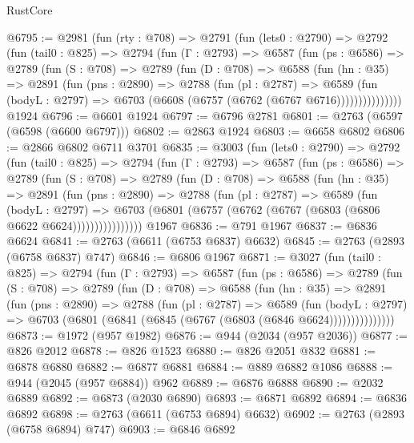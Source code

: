 \begin{lexlean}{RustCore}
\begin{coremodule}
@6795 := @2981
    (fun (rty : @708) =>
    @2791
      (fun (lets0 : @2790) =>
      @2792
        (fun (tail0 : @825) =>
        @2794
          (fun (Γ : @2793) =>
          @6587
            (fun (ps : @6586) =>
            @2789
              (fun (S : @708) =>
              @2789
                (fun (D : @708) =>
                @6588
                  (fun (hn : @35) =>
                  @2891
                    (fun (pns : @2890) =>
                    @2788
                      (fun (pl : @2787) =>
                      @6589
                        (fun (bodyL : @2797) =>
                        @6703 (@6608 (@6757 (@6762 (@6767 @6716)))))))))))))))
    @1924
@6796 := @6601 @1924
@6797 := @6796 @2781
@6801 := @2763 (@6597 (@6598 (@6600 @6797)))
@6802 := @2863 @1924
@6803 := @6658 @6802
@6806 := @2866 @6802 @6711 @3701
@6835 := @3003
    (fun (lets0 : @2790) =>
    @2792
      (fun (tail0 : @825) =>
      @2794
        (fun (Γ : @2793) =>
        @6587
          (fun (ps : @6586) =>
          @2789
            (fun (S : @708) =>
            @2789
              (fun (D : @708) =>
              @6588
                (fun (hn : @35) =>
                @2891
                  (fun (pns : @2890) =>
                  @2788
                    (fun (pl : @2787) =>
                    @6589
                      (fun (bodyL : @2797) =>
                      @6703 (@6801 (@6757 (@6762 (@6767 (@6803 (@6806 @6622 @6624))))))))))))))))
    @1967
@6836 := @791 @1967
@6837 := @6836 @6624
@6841 := @2763 (@6611 (@6753 @6837) @6632)
@6845 := @2763 (@2893 (@6758 @6837) @747)
@6846 := @6806 @1967
@6871 := @3027
    (fun (tail0 : @825) =>
    @2794
      (fun (Γ : @2793) =>
      @6587
        (fun (ps : @6586) =>
        @2789
          (fun (S : @708) =>
          @2789
            (fun (D : @708) =>
            @6588
              (fun (hn : @35) =>
              @2891
                (fun (pns : @2890) =>
                @2788
                  (fun (pl : @2787) =>
                  @6589
                    (fun (bodyL : @2797) =>
                    @6703 (@6801 (@6841 (@6845 (@6767 (@6803 (@6846 @6624)))))))))))))))
@6873 := @1972 (@957 @1982)
@6876 := @944 (@2034 (@957 @2036))
@6877 := @826 @2012
@6878 := @826 @1523
@6880 := @826 @2051 @832
@6881 := @6878 @6880
@6882 := @6877 @6881
@6884 := @889 @6882 @1086
@6888 := @944 (@2045 (@957 @6884)) @962
@6889 := @6876 @6888
@6890 := @2032 @6889
@6892 := @6873 (@2030 @6890)
@6893 := @6871 @6892
@6894 := @6836 @6892
@6898 := @2763 (@6611 (@6753 @6894) @6632)
@6902 := @2763 (@2893 (@6758 @6894) @747)
@6903 := @6846 @6892

\end{coremodule}
\end{lexlean}
